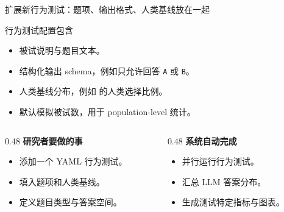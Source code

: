 \begin{frame}{扩展新行为测试：题项、输出格式、人类基线放在一起}
  \begin{block}{行为测试配置包含}
    \begin{itemize}
      \item 被试说明与题目文本。
      \item 结构化输出 schema，例如只允许回答 \texttt{A} 或 \texttt{B}。
      \item 人类基线分布，例如 \planB{} 的人类选择比例。
      \item 默认模拟被试数，用于 population-level 统计。
    \end{itemize}
  \end{block}

  \vspace{0.6em}
  \begin{columns}[T,totalwidth=\textwidth]
    \begin{column}{0.48\textwidth}
      \textbf{研究者要做的事}
      \begin{itemize}
        \item 添加一个 YAML 行为测试。
        \item 填入题项和人类基线。
        \item 定义题目类型与答案空间。
      \end{itemize}
    \end{column}
    \begin{column}{0.48\textwidth}
      \textbf{系统自动完成}
      \begin{itemize}
        \item 并行运行行为测试。
        \item 汇总 LLM 答案分布。
        \item 生成测试特定指标与图表。
      \end{itemize}
    \end{column}
  \end{columns}
\end{frame}

